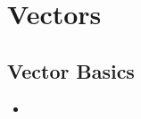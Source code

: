 \chapter{Vectors}\label{Vectors}

\section{Vector Basics}\label{Vector Basics}
\begin{itemize}
    \item 
\end{itemize}
